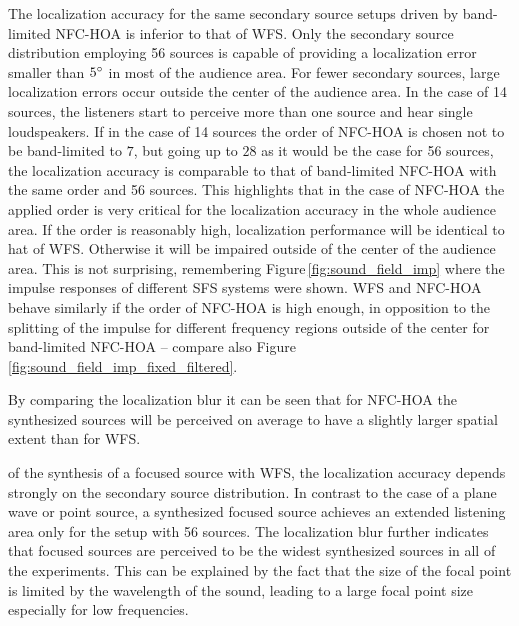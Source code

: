 The localization accuracy for the same secondary source setups driven by
band-limited \ac{NFC-HOA} is inferior to that of \ac{WFS}. Only the secondary source
distribution employing 56 sources is capable of providing a localization error
smaller than $5^\circ$ in most of the audience area. For fewer secondary
sources, large localization errors occur outside the center of the audience
area. In the case of 14 sources, the listeners start to perceive more than one
source and hear single loudspeakers.
If in the case of 14 sources the order of \ac{NFC-HOA} is chosen not to be
band-limited to $7$, but going up to $28$ as it would be the case for 56
sources, the localization accuracy is comparable to that of band-limited
\ac{NFC-HOA} with the same order and 56 sources. This highlights that in the
case of \ac{NFC-HOA} the applied order is very critical for the localization
accuracy in the whole audience area. If the order is reasonably high,
localization performance will be identical to hat of \ac{WFS}. Otherwise it will be
impaired outside of the center of the audience area.
This is not surprising, remembering Figure\,\ref{fig:sound_field_imp} where the
impulse responses of different \ac{SFS} systems were shown. \ac{WFS} and
\ac{NFC-HOA} behave similarly if the order of \ac{NFC-HOA} is high enough,
in opposition to the splitting of the impulse for different frequency regions
outside of the center for band-limited
\ac{NFC-HOA} -- compare also Figure\,\ref{fig:sound_field_imp_fixed_filtered}.

By comparing the localization blur it can be seen that for \ac{NFC-HOA} the
synthesized sources will be perceived on average to have a slightly larger spatial
extent than for \ac{WFS}.

 of the synthesis of a focused source with
\ac{WFS}, the
localization accuracy depends strongly on the secondary source distribution. In
contrast to the case of a plane wave or point source, a synthesized focused
source achieves an extended listening area only for the setup with 56 sources.
The localization blur further indicates that focused sources are perceived to be
the widest synthesized sources in all of the experiments. This can be explained
by the fact that the size of the focal point is limited by the wavelength of the
sound, leading to a large focal point size especially for low frequencies.


